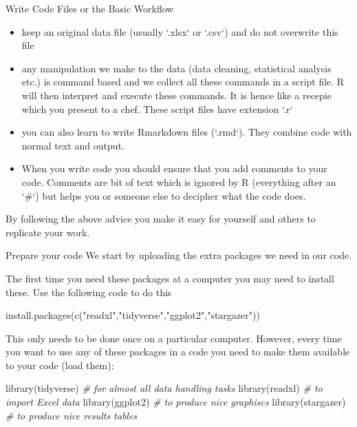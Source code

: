 \documentclass[
  ignorenonframetext,
]{beamer}
\newenvironment{Shaded}{\begin{snugshade}}{\end{snugshade}}
\newcommand{\CommentTok}[1]{\textcolor[rgb]{0.56,0.35,0.01}{\textit{#1}}}
\newcommand{\FunctionTok}[1]{\textcolor[rgb]{0.00,0.00,0.00}{#1}}
\newcommand{\NormalTok}[1]{#1}
\newcommand{\StringTok}[1]{\textcolor[rgb]{0.31,0.60,0.02}{#1}}
\begin{document}
\begin{frame}{Write Code Files or the Basic Workflow}
\protect\hypertarget{write-code-files-or-the-basic-workflow}{}
\begin{itemize}
  \item keep an original data file (usually `.xlsx` or `.csv`) and do not overwrite this file
  \item any manipulation we make to the data (data cleaning, statistical analysis etc.) is command based and we collect all these commands in a script file. R will then interpret and execute these commands. It is hence like a recepie which you present to a chef. These script files have extension `.r`
  \item you can also learn to write Rmarkdown files (`.rmd`). They combine code with normal text and output. 
  \item When you write code you should ensure that you add comments to your code. Comments are bit of text which is ignored by R (everything after an `\#`) but helps you or someone else to decipher what the code does.

\end{itemize}

By following the above advice you make it easy for yourself and others
to replicate your work.
\end{frame}

\begin{frame}[fragile]{Prepare your code}
\protect\hypertarget{prepare-your-code}{}
We start by uploading the extra packages we need in our code.

The first time you need these packages at a computer you may need to
install these. Use the following code to do this

\begin{Shaded}
\begin{Highlighting}[]
\FunctionTok{install.packages}\NormalTok{(}\FunctionTok{c}\NormalTok{(}\StringTok{"readxl"}\NormalTok{,}\StringTok{"tidyverse"}\NormalTok{,}\StringTok{"ggplot2"}\NormalTok{,}\StringTok{"stargazer"}\NormalTok{))}
\end{Highlighting}
\end{Shaded}

This only needs to be done once on a particular computer. However, every
time you want to use any of these packages in a code you need to make
them available to your code (load them):

\begin{Shaded}
\begin{Highlighting}[]
\FunctionTok{library}\NormalTok{(tidyverse)    }\CommentTok{\# for almost all data handling tasks}
\FunctionTok{library}\NormalTok{(readxl)       }\CommentTok{\# to import Excel data}
\FunctionTok{library}\NormalTok{(ggplot2)      }\CommentTok{\# to produce nice graphiscs}
\FunctionTok{library}\NormalTok{(stargazer)    }\CommentTok{\# to produce nice results tables}
\end{Highlighting}
\end{Shaded}
\end{frame}
\end{document}
